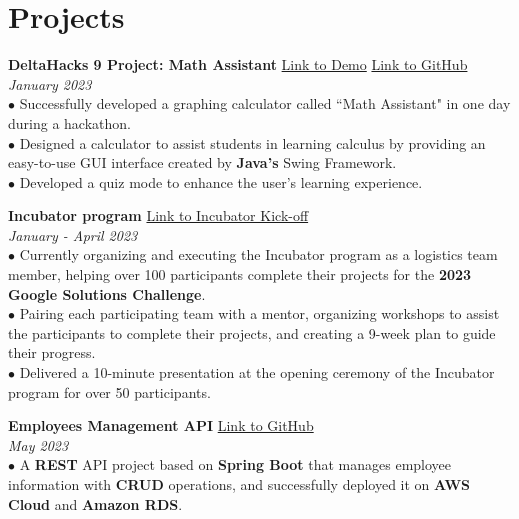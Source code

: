 \documentclass[letterpaper,12pt]{article}
\begin{document}
\section{Projects}
\textbf{DeltaHacks 9 Project: Math Assistant} \hfill \href{https://devpost.com/software/math-helper-graphing-calculator}{Link to Demo} \hspace{0.2cm} \href{https://github.com/Zicheng-Li/Math_helper}{Link to GitHub} \\
\textit{January 2023} \\ 
\hspace{0.1cm} $\bullet$ Successfully developed a graphing calculator called ``Math Assistant" in one day during a hackathon. \\
\hspace{0.1cm} $\bullet$ Designed a calculator to assist students in learning calculus by providing an easy-to-use GUI interface created by \textbf{Java's} Swing Framework.\\ 
\hspace{0.1cm} $\bullet$ Developed a quiz mode to enhance the user's learning experience.

\textbf{Incubator program} \hfill \href{https://youtu.be/gJmWtfJp0Yc?t=345}{Link to Incubator Kick-off}\\
\textit{January - April 2023}\\
\hspace{0.1cm} $\bullet$ Currently organizing and executing the Incubator program as a logistics team member, helping over 100 participants complete their projects for the \textbf{2023 Google Solutions Challenge}. \\
\hspace{0.1cm} $\bullet$ Pairing each participating team with a mentor, organizing workshops to assist the participants to complete their projects, and creating a 9-week plan to guide their progress. \\ 
\hspace{0.1cm} $\bullet$ Delivered a 10-minute presentation at the opening ceremony of the Incubator program for over 50 participants.

\textbf{Employees Management API} \hfill \href{https://github.com/Zicheng-Li/employees-management-project}{Link to GitHub} \\
\textit{May 2023} \\ 
\hspace{0.1cm} $\bullet$ A \textbf{REST} API project based on \textbf{Spring Boot} that manages employee information with \textbf{CRUD} operations, and successfully deployed it on \textbf{AWS Cloud} and \textbf{Amazon RDS}.
\end{document}
